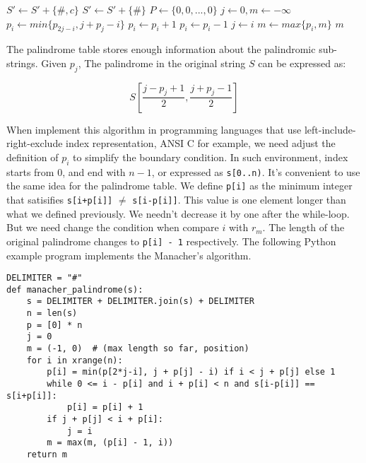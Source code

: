 \documentclass[b5paper]{article}
\begin{document}
\begin{algorithmic}[1]
    \State $S' \gets S' + \{\#, c\}$
  \EndFor
  \State $S' \gets S' + \{\#\}$ 
  \State $P \gets \{0, 0, ..., 0\}$ 
  \State $j \gets 0, m \gets -\infty$
      \State $p_i \gets min \{p_{2j-i}, j + p_j - i\}$
    \EndIf
      \State $p_i \gets p_i + 1$
    \EndWhile
    \State $p_i \gets p_i - 1$
      \State $j \gets i$
    \EndIf
    \State $m \gets max \{p_i, m \}$
  \EndFor
  \State \Return $m$
\EndFunction
\end{algorithmic}

The palindrome table stores enough information about the palindromic sub-strings.
Given $p_j$, The palindrome in the original string $S$ can be expressed as:

\begin{equation}
S[\frac{j-p_j + 1}{2}, \frac{j+p_j-1}{2}]
\end{equation}

When implement this algorithm in programming languages that use left-include-
right-exclude index representation, ANSI C for example, we need adjust
the definition of $p_i$ to simplify the boundary condition. In such environment,
index starts from 0, and end with $n-1$, or expressed as \texttt{s[0..n)}.
It's convenient to use the same idea for the palindrome table. We
define \texttt{p[i]} as the minimum integer that satisifies \texttt{s[i+p[i]]}
$\neq$ \texttt{s[i-p[i]]}. This value is one element longer than what
we defined previously. We needn't decrease it by one after the while-loop.
But we need change the condition when compare $i$ with $r_m$. The length
of the original palindrome changes to \texttt{p[i] - 1} respectively.
The following Python example program implements the Manacher's algorithm.

\lstset{language=Python}
\begin{lstlisting}
DELIMITER = "#"
def manacher_palindrome(s):
    s = DELIMITER + DELIMITER.join(s) + DELIMITER
    n = len(s)
    p = [0] * n
    j = 0
    m = (-1, 0)  # (max length so far, position)
    for i in xrange(n):
        p[i] = min(p[2*j-i], j + p[j] - i) if i < j + p[j] else 1
        while 0 <= i - p[i] and i + p[i] < n and s[i-p[i]] == s[i+p[i]]:
            p[i] = p[i] + 1
        if j + p[j] < i + p[i]:
            j = i
        m = max(m, (p[i] - 1, i))
    return m
\end{lstlisting}
\end{document}
